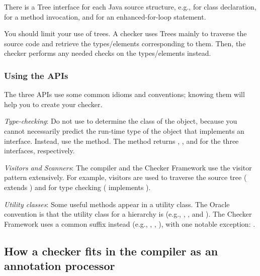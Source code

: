 There is a Tree interface for each Java source structure, e.g.,
 for class declaration, 
for a method invocation, and  for an enhanced-for-loop
statement.

You should limit your use of trees. A checker uses Trees mainly to
traverse the source code and retrieve the types/elements corresponding to
them.  Then, the checker performs any needed checks on the types/elements instead.


\subsubsection{Using the APIs\label{creating-using-the-apis}}

The three APIs use some common idioms and conventions; knowing them will
help you to create your checker.

\emph{Type-checking}:
Do not use  to determine the class of the object,
because you cannot necessarily predict the run-time type of the object that
implements an interface.  Instead, use the  method.  The
method returns ,
, and 
for the three interfaces, respectively.

\emph{Visitors and Scanners}:
The compiler and the Checker Framework use the visitor pattern
extensively. For example, visitors are used to traverse the source tree
( extends
) and for type
checking ( implements
).

\emph{Utility classes}:
Some useful methods appear in a utility class.  The Oracle convention is that
the utility class for a  hierarchy is  (e.g.,
, , and
).  The Checker Framework uses a common
 suffix instead (e.g., ,
, ), with one
notable exception: .


\subsection{How a checker fits in the compiler as an annotation processor\label{creating-checker-as-annotation-processor}}

